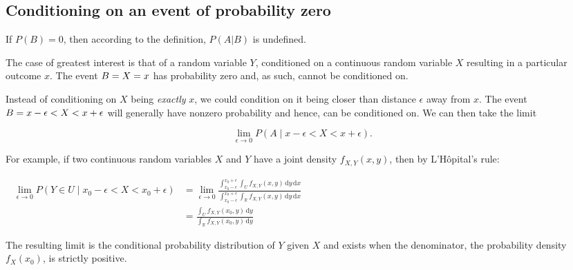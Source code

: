 \subsection{Conditioning on an event of probability zero}
\label{sss:cond-162f}




If $P(B)=0$, then according to the definition, $P(A|B)$ is undefined.



The case of greatest interest is that of a random variable $Y$, conditioned on a
continuous random variable $X$ resulting in a particular outcome $x$. The event $B = \\{ X
= x \\}$ has probability zero and, as such, cannot be conditioned on.



Instead of conditioning on $X$ being \textit{exactly} $x$, we could condition on it being
closer than distance $\epsilon$ away from $x$. The event $B = \\{ x-\epsilon < X <
x+\epsilon \\}$ will generally have nonzero probability and hence, can be conditioned on.
We can then take the limit



$$\lim _{\epsilon \to 0} P(A \mid x-\epsilon < X < x+\epsilon).$$



For example, if two continuous random variables $X$ and $Y$ have a joint density $f
_{X,Y}(x,y)$, then by L'Hôpital's rule:



\begin{align} \lim _{\epsilon \to 0} P(Y \in U \mid x _0-\epsilon < X < x _0+\epsilon) & = \lim _{\epsilon \to 0} \frac{\int _{x _0-\epsilon}^{x _0+\epsilon} \int _U f _{X, Y}(x, y) \,\mathrm{d}y \,\mathrm{d}x}{\int _{x _0-\epsilon}^{x _0+\epsilon} \int _\mathbb{R} f _{X, Y}(x, y) \,\mathrm{d}y \,\mathrm{d}x} \hspace{30em} \\ & = \frac{\int _U f _{X, Y}(x _0, y) \,\mathrm{d}y}{\int _\mathbb{R} f _{X, Y}(x _0, y) \,\mathrm{d}y} \end{align}



The resulting limit is the conditional probability distribution of $Y$ given $X$ and
exists when the denominator, the probability density $f _X(x _0)$, is strictly positive.



